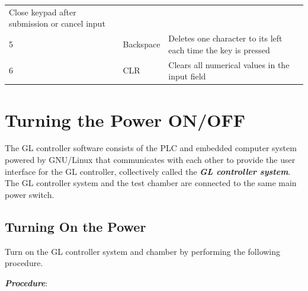 \begin{longtable}[]{@{}lll@{}}
\begin{minipage}[t]{0.65\columnwidth}
Close keypad after submission or cancel input\strut
\end{minipage}\tabularnewline
\begin{minipage}[t]{0.04\columnwidth}\raggedright
5\strut
\end{minipage} & \begin{minipage}[t]{0.23\columnwidth}\raggedright
Backspace\strut
\end{minipage} & \begin{minipage}[t]{0.65\columnwidth}\raggedright
Deletes one character to its left each time the key is pressed\strut
\end{minipage}\tabularnewline
\begin{minipage}[t]{0.04\columnwidth}\raggedright
6\strut
\end{minipage} & \begin{minipage}[t]{0.23\columnwidth}\raggedright
CLR\strut
\end{minipage} & \begin{minipage}[t]{0.65\columnwidth}\raggedright
Clears all numerical values in the input field\strut
\end{minipage}\tabularnewline
\bottomrule
\end{longtable}


\section{Turning the Power
ON/OFF}

The GL controller software consists of the PLC and embedded computer
system powered by GNU/Linux that communicates with each other to provide
the user interface for the GL controller, collectively called the
\emph{\textbf{GL controller system}}. The GL controller system and the
test chamber are connected to the same main power switch.


\subsection{Turning On the Power}

Turn on the GL controller system and chamber by performing the following
procedure.

\textbf{\emph{Procedure}}:

